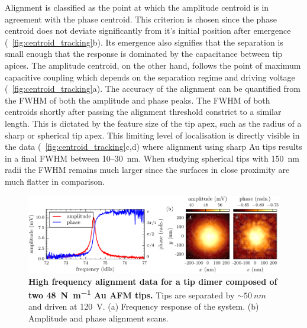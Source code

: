 \documentclass{article}
\begin{document}
Alignment is classified as the point at which the amplitude centroid is in agreement with the phase centroid. This criterion is chosen since the phase centroid does not deviate significantly from it's initial position after emergence (\figurename~\ref{fig:centroid_tracking}b). Its emergence also signifies that the separation is small enough that the response is dominated by the capacitance between tip apices. The amplitude centroid, on the other hand, follows the point of maximum capacitive coupling which depends on the separation regime and driving voltage (\figurename~\ref{fig:centroid_tracking}a). The accuracy of the alignment can be quantified from the FWHM of both the amplitude and phase peaks. The FWHM of both centroids shortly after passing the alignment threshold constrict to a similar length. This is dictated by the feature size of the tip apex, such as the radius of a sharp or spherical tip apex. This limiting level of localisation is directly visible in the data (\figurename~\ref{fig:centroid_tracking}c,d) where alignment using sharp Au tips results in a final FWHM between 10--\SI{30}{nm}. When studying spherical tips with \SI{150}{nm} radii the FWHM remains much larger since the surfaces in close proximity are much flatter in comparison. %

\begin{figure}[bt]
\centering
\includegraphics{figures/hf_alignment_data}
\caption[High frequency alignment data for a tip dimer composed of two \SI{48}{N\per\metre} Au AFM tips]{\textbf{High frequency alignment data for a tip dimer composed of two \SI{48}{N\per\metre} Au AFM tips.} Tips are separated by $\sim\SI{50}{nm}$ and driven at \SI{120}{V}. (a) Frequency response of the system. (b) Amplitude and phase alignment scans.}
\label{fig:hf_alignment_data} 
\end{figure}
\end{document}
